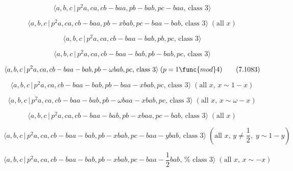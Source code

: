 \documentclass[10pt]{article}
\begin{document}
\begin{equation}
\langle a,b,c\,|\,p^2a,ca,cb-baa,pb-bab,pc-baa,\,\text{class }3\rangle 
\tag{7.1079}
\end{equation}

\begin{equation}
\langle a,b,c\,|\,p^2a,ca,cb-baa,pb-xbab,pc-baa-bab,\,\text{class }3\rangle
\;(\text{all }x)  \tag{7.1080}
\end{equation}

\begin{equation}
\langle a,b,c\,|\,p^2a,ca,cb-baa-bab,pb,pc,\,\text{class }3\rangle 
\tag{7.1081}
\end{equation}

\begin{equation}
\langle a,b,c\,|\,p^2a,ca,cb-baa-bab,pb-bab,pc,\,\text{class }3\rangle 
\tag{7.1082}
\end{equation}

\begin{equation}
\langle a,b,c\,|\,p^{2}a,ca,cb-baa-bab,pb-\omega bab,pc,\,\text{class }%
3\rangle \;(p=1\func{mod}4)  \tag{7.1083}
\end{equation}

\begin{equation}
\langle a,b,c\,|\,p^{2}a,ca,cb-baa-bab,pb-baa-xbab,pc,\,\text{class }%
3\rangle \;(\text{all }x,\,x\sim 1-x)  \tag{7.1084}
\end{equation}

\begin{equation}
\langle a,b,c\,|\,p^{2}a,ca,cb-baa-bab,pb-\omega baa-xbab,pc,\,\text{class }%
3\rangle \;(\text{all }x,\,x\sim \omega -x)  \tag{7.1085}
\end{equation}

\begin{equation}
\langle a,b,c\,|\,p^2a,ca,cb-baa-bab,pb-xbaa,pc-bab,\,\text{class }3\rangle
\;(\text{all }x)  \tag{7.1086}
\end{equation}

\begin{equation}
\langle a,b,c\,|\,p^{2}a,ca,cb-baa-bab,pb-xbab,pc-baa-ybab,\,\text{class }%
3\rangle \;(\text{all }x,\,y\neq \frac{1}{2},\;y\sim 1-y)  \tag{7.1087}
\end{equation}

\begin{equation}
\langle a,b,c\,|\,p^{2}a,ca,cb-baa-bab,pb-xbab,pc-baa-\frac{1}{2}bab,\,\text{%
class }3\rangle \;(\text{all }x,\,x\sim -x)  \tag{7.1088}
\end{equation}
\end{document}
